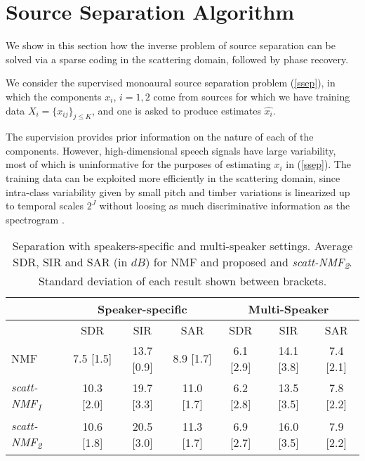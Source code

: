 \section{Source Separation Algorithm}
\label{algosec}
We show in this section how the inverse problem of source separation 
can be solved via a sparse coding in the scattering domain, followed by phase recovery.

We consider the supervised 
monoaural source separation problem (\ref{ssep}), 
 in which the components $x_i$, $i=1,2$ come from sources for 
 which we have training data $X_i=\{x_{ij}\}_{j \leq K}$, 
and one is asked to produce estimates $\widehat{x_i}$. 

The supervision provides  prior information on the nature of each of the 
components. However, high-dimensional speech signals have large variability, 
most of which is uninformative for the purposes of estimating $x_i$ in (\ref{ssep}).
The training data can be exploited more efficiently in the scattering domain, since 
intra-class variability given by small pitch and timber variations is linearized up to 
 temporal scales $2^J$ without loosing as much discriminative information as 
the spectrogram \cite{deepscatt,pami}.

\begin{table*}[t]
\centering
\begin{tabular}{l|c|c|c || c |c |c }
  \hline\hline
  & \multicolumn{3}{c||}{Speaker-specific} & \multicolumn{3}{c}{Multi-Speaker} \\
  \hline
 & SDR & SIR & SAR & SDR & SIR & SAR\\
\hline
NMF  &7.5 [1.5] & 13.7 [0.9] &   8.9 [1.7] & 6.1 [2.9] &   14.1 [3.8] & 7.4 [2.1] \\
\hline
\emph{scatt-NMF\textsubscript{1}} & 10.3 [2.0]  & 19.7 [3.3]  & 11.0 [1.7] &  6.2 [2.8] &   13.5 [3.5] & 7.8 [2.2] \\
\emph{scatt-NMF\textsubscript{2}} &  10.6 [1.8] & 20.5 [3.0]  & 11.3 [1.7]  &  6.9 [2.7] & 16.0 [3.5]  & 7.9 [2.2] \\
  \hline
\end{tabular}

\caption{Separation with speakers-specific and multi-speaker settings. Average SDR, SIR and SAR (in $dB$) for NMF and proposed  and \emph{scatt-NMF\textsubscript{2}}. Standard deviation of each result shown between brackets. \label{ta:eval}}
\vspace{-2ex}
\end{table*}


